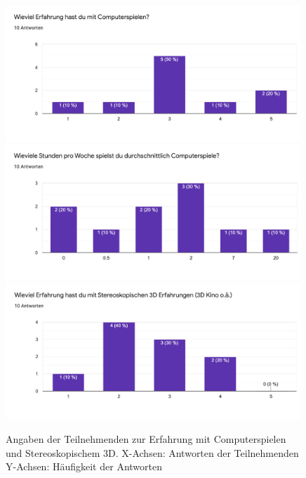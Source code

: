         \begin{figure}[H]
            \centering
            \includegraphics[width=0.99\textwidth]{images/erfahrungpc.png}
            \includegraphics[width=0.99\textwidth]{images/pcstundenprowoche.png}
            \includegraphics[width=0.99\textwidth]{images/3derfahrung.png}
            \caption{Angaben der Teilnehmenden zur Erfahrung mit Computerspielen und Stereoskopischem 3D.
            X-Achsen: Antworten der Teilnehmenden
            Y-Achsen: Häufigkeit der Antworten}\label{figure:videogames}
        \end{figure}

